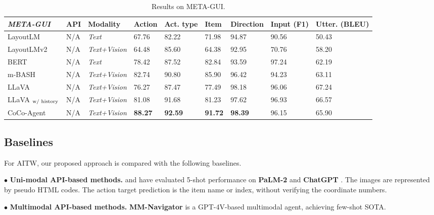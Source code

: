 \begin{table*}[htb]
	\centering\small
	\begin{tabular}{p{2cm}p{0.8cm}p{1.5cm}p{1cm}p{1.3cm}p{1cm}p{1cm}p{1.4cm}p{1.9cm}}
		\toprule
		\textbf{\emph{META-GUI}} & \textbf{API} & \textbf{Modality} & \textbf{Action} & \textbf{Act. type} &\textbf{Item} & \textbf{Direction} & \textbf{Input (F1)} & \textbf{Utter. (BLEU)} \\
            \midrule
            LayoutLM &N/A & \textit{Text} &67.76 & 82.22 & 71.98 & 94.87 & 90.56 & 50.43\\
            LayoutLMv2  &N/A & \textit{Text+Vision} &64.48 & 85.60 & 64.38 & 92.95 & 70.76 & 58.20\\
            BERT &N/A & \textit{Text} &78.42 &87.52 & 82.84 & 93.59 & 97.24 & 62.19\\
            m-BASH  &N/A & \textit{Text+Vision} &82.74 & 90.80 & 85.90 & 96.42 & 94.23 &63.11\\
            \hdashline
            LLaVA  &N/A & \textit{Text+Vision} & 76.27 &  87.47 & 77.49 & 98.18 &96.06  & 67.24 \\
            LLaVA $_{\textup{w/ history}}$  &N/A & \textit{Text+Vision} &81.08&  91.68& 81.23 &  97.62&  96.93 & 66.57 \\
            CoCo-Agent &N/A & \textit{Text+Vision} & \textbf{88.27} & \textbf{92.59}  & \textbf{91.72} & \textbf{98.39} &96.15  & 65.90 \\
		\bottomrule
	\end{tabular}
        \caption{Results on META-GUI. }
	\label{mainmetagui}
\end{table*}

\subsection{Baselines}
For AITW, our proposed approach is compared with the following baselines.

$\bullet$ \textbf{Uni-modal API-based methods.}  
\citet{rawles2023android} and \citet{zhang2023you} have evaluated 5-shot performance on 
\textbf{PaLM-2} \cite{anil2023palm} and \textbf{ChatGPT} \cite{ouyang2022training}. The images are represented by pseudo HTML codes. The action target prediction is the item name or index, without verifying the coordinate numbers.

$\bullet$ \textbf{Multimodal API-based methods.}  \textbf{MM-Navigator} \cite{yan2023gpt} is a GPT-4V-based multimodal agent, achieving few-shot SOTA.

